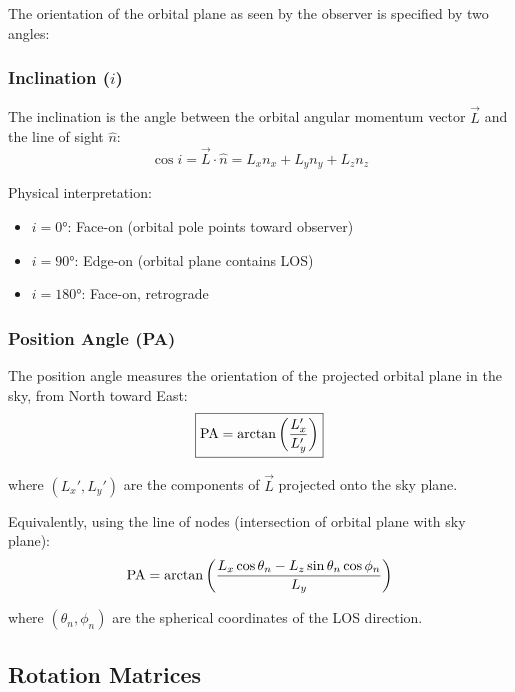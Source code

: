 \documentclass[twocolumn,amsmath,amssymb,prd,superscriptaddress,nofootinbib]{revtex4-2}
\begin{document}
The orientation of the orbital plane as seen by the observer is specified by two angles:

\subsubsection{Inclination ($i$)}

The inclination is the angle between the orbital angular momentum vector $\vec{L}$ and the line of sight $\hat{n}$:
\begin{equation}
    \boxed{\cos i = \vec{L} \cdot \hat{n} = L_x n_x + L_y n_y + L_z n_z}
    \label{eq:inclination}
\end{equation}

Physical interpretation:
\begin{itemize}
    \item $i = 0°$: Face-on (orbital pole points toward observer)
    \item $i = 90°$: Edge-on (orbital plane contains LOS)
    \item $i = 180°$: Face-on, retrograde
\end{itemize}

\subsubsection{Position Angle (PA)}

The position angle measures the orientation of the projected orbital plane in the sky, from North toward East:
\begin{equation}
    \boxed{{\rm PA} = \arctan\left(\frac{L_x'}{L_y'}\right)}
    \label{eq:PA}
\end{equation}

where $(L_x', L_y')$ are the components of $\vec{L}$ projected onto the sky plane.

Equivalently, using the line of nodes (intersection of orbital plane with sky plane):
\begin{equation}
    {\rm PA} = \arctan\left(\frac{L_x \cos\theta_n - L_z \sin\theta_n \cos\phi_n}{L_y}\right)
\end{equation}

where $(\theta_n, \phi_n)$ are the spherical coordinates of the LOS direction.

\subsection{Rotation Matrices}
\label{sec:rotation_matrices}
\end{document}
